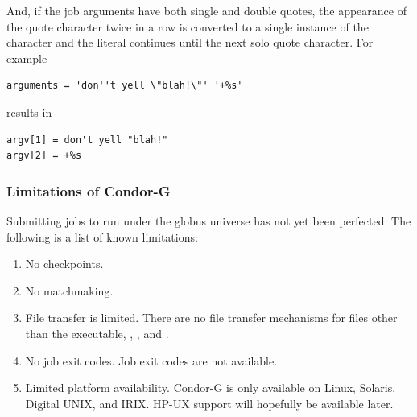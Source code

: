 And, if the job arguments have both single and double quotes,
the appearance of the quote character twice in a
row is converted to a single instance of the character and the literal
continues until the next solo quote character.
For example
\begin{verbatim}
arguments = 'don''t yell \"blah!\"' '+%s'
\end{verbatim}
results in
\begin{verbatim}
argv[1] = don't yell "blah!"
argv[2] = +%s
\end{verbatim}

\subsubsection{\label{sec:Condor-G-Limits}Limitations of Condor-G}
Submitting jobs to run under the globus universe has not yet
been perfected.
The following is a list of known limitations:

\begin{enumerate}
\item{No checkpoints.}
\item{No matchmaking.}
\item{File transfer is limited.}
There are no file transfer mechanisms for files other
than the executable, , , and .
\item{No job exit codes.}
Job exit codes are not available.
\item{Limited platform availability.}
Condor-G is only available on Linux, Solaris,
Digital UNIX, and IRIX.
HP-UX support will hopefully be available later.
\end{enumerate}
